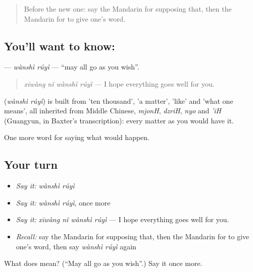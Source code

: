\label{lesson:ZH-C534-wanshiruyi}



\begin{quote}
Before the new one: say the Mandarin for supposing that, then the Mandarin for to give one's word.
\end{quote}

\subsection*{You'll want to know: }
\textbf{} — \emph{wànshì rúyì} — \textquotedblleft{}may all go as you wish\textquotedblright{}.

\begin{quote}
\textbf{} \emph{xīwàng nǐ wànshì rúyì} — I hope everything goes well for you.
\end{quote}

\begin{cousinweb}
\textbf{} (\emph{wànshì rúyì}) is built from  'ten thousand',  'a matter',  'like' and  'what one means', all inherited from Middle Chinese, \emph{mjonH}, \emph{dzriH}, \emph{nyo} and \emph{'iH} (Guangyun, in Baxter's transcription): every matter as you would have it.
\end{cousinweb}

\begin{grammarlens}[title={What you've built}]
One more word for saying what would happen.
\end{grammarlens}

\subsection*{Your turn}
\begin{itemize}
\raggedright
  \item \emph{Say it:} \emph{wànshì rúyì}
  \item \emph{Say it:} \emph{wànshì rúyì}, once more
  \item \emph{Say it:} \emph{xīwàng nǐ wànshì rúyì} — I hope everything goes well for you.
  \item \emph{Recall:} say the Mandarin for supposing that, then the Mandarin for to give one's word, then say \emph{wànshì rúyì} again
\end{itemize}

\begin{tcolorbox}[breakable,colback=teal!4,colframe=teal!35!black,title={Before you move on}]
What does  mean? (\textquotedblleft{}May all go as you wish\textquotedblright{}.) Say it once more.
\end{tcolorbox}
